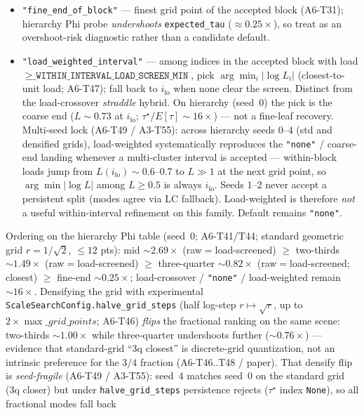\documentclass[11pt]{article}
\begin{document}
\begin{itemize}[leftmargin=1.5em]
  \item \texttt{"fine\_end\_of\_block"} --- finest grid point of the accepted
  block (A6-T31); hierarchy Phi probe \emph{undershoots}
  \texttt{expected\_tau} ($\approx 0.25\times$), so treat as an overshoot-risk
  diagnostic rather than a candidate default.
  \item \texttt{"load\_weighted\_interval"} --- among indices in the accepted
  block with load $\ge\texttt{\_WITHIN\_INTERVAL\_LOAD\_SCREEN\_MIN}$, pick
  $\arg\min_i|\log L_i|$ (closest-to-unit load; A6-T47); fall back to
  $i_{\mathrm{lo}}$ when none clear the screen. Distinct from the
  load-crossover \emph{straddle} hybrid. On hierarchy (seed~$0$) the pick is
  the coarse end ($L\sim 0.73$ at $i_{\mathrm{lo}}$; $\tau^\star/E[\tau]
  \sim 16\times$) --- not a fine-leaf recovery. Multi-seed lock (A6-T49 /
  A3-T55): across hierarchy seeds $0$--$4$ (std and densified grids),
  load-weighted systematically reproduces the \texttt{"none"} / coarse-end
  landing whenever a multi-cluster interval is accepted --- within-block loads
  jump from $L(i_{\mathrm{lo}})\sim 0.6$--$0.7$ to $L\gg 1$ at the next grid
  point, so $\arg\min|\log L|$ among $L\ge 0.5$ is always $i_{\mathrm{lo}}$.
  Seeds $1$--$2$ never accept a persistent split (modes agree via LC
  fallback). Load-weighted is therefore \emph{not} a useful within-interval
  refinement on this family. Default remains \texttt{"none"}.
\end{itemize}
Ordering on the hierarchy Phi table (seed~$0$; A6-T41/T44; standard geometric
grid $r{=}1/\sqrt{2}$, $\le 12$ pts): mid
$\sim 2.69\times$ (raw${=}$load-screened) $\ge$ two-thirds $\sim 1.49\times$
(raw${=}$load-screened) $\ge$ three-quarter $\sim 0.82\times$
(raw${=}$load-screened; closest) $\ge$ fine-end $\sim 0.25\times$;
load-crossover / \texttt{"none"} / load-weighted remain $\sim 16\times$.
Densifying the grid with experimental
\texttt{ScaleSearchConfig.halve\_grid\_steps} (half log-step
$r\!\mapsto\!\sqrt{r}$, up to $2\times\max\_grid\_points$; A6-T46) \emph{flips}
the fractional ranking on the same scene: two-thirds $\sim 1.00\times$ while
three-quarter undershoots further ($\sim 0.76\times$) --- evidence that
standard-grid ``3q closest'' is discrete-grid quantization, not an intrinsic
preference for the $3/4$ fraction (A6-T46..T48 / paper). That densify flip is
\emph{seed-fragile} (A6-T49 / A3-T55): seed~$4$ matches seed~$0$ on the
standard grid (3q closer) but under \texttt{halve\_grid\_steps} persistence
rejects ($\tau^\star$ index \texttt{None}), so all fractional modes fall back
\end{document}
